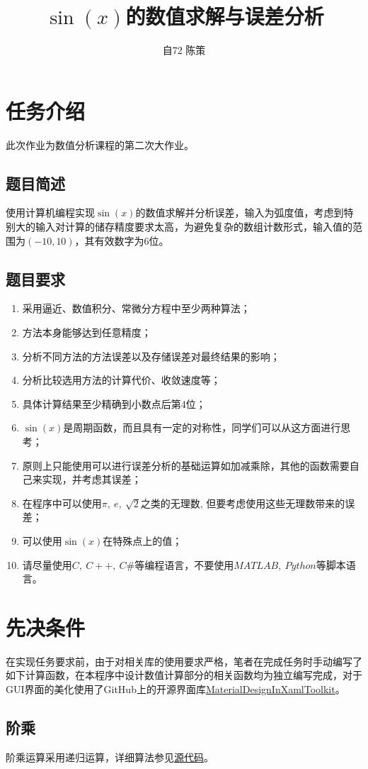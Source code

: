 \documentclass[lang=cn,11pt,a4paper]{elegantpaper}
\title{$\sin(x)$的数值求解与误差分析}
\author{自72 \quad 陈策 \quad 2017011619}
\date{\zhtoday}
\begin{document}
\maketitle
\tableofcontents
\clearpage
\section{任务介绍}
此次作业为数值分析课程的第二次大作业。
\subsection{题目简述}
使用计算机编程实现$\sin(x)$的数值求解并分析误差，输入为弧度值，考虑到特别大的输入对计算的储存精度要求太高，为避免复杂的数组计数形式，输入值的范围为$(-10,10)$，其有效数字为6位。
\subsection{题目要求}
\begin{enumerate}
  \item 采用逼近、数值积分、常微分方程中至少两种算法；
  \item 方法本身能够达到任意精度；
  \item 分析不同方法的方法误差以及存储误差对最终结果的影响；
  \item 分析比较选用方法的计算代价、收敛速度等；
  \item 具体计算结果至少精确到小数点后第4位；
  \item $\sin(x)$是周期函数，而且具有一定的对称性，同学们可以从这方面进行思考；
  \item 原则上只能使用可以进行误差分析的基础运算如加减乘除，其他的函数需要自己来实现，并考虑其误差；
  \item 在程序中可以使用$\pi,\ e, \ \sqrt{2}$之类的无理数, 但要考虑使用这些无理数带来的误差；
  \item 可以使用$\sin(x)$在特殊点上的值；
  \item 请尽量使用$C,\ C++,\ C\#$等编程语言，不要使用$MATLAB,\ Python$等脚本语言。
\end{enumerate}
\section{先决条件}
在实现任务要求前，由于对相关库的使用要求严格，笔者在完成任务时手动编写了如下计算函数，在本程序中设计数值计算部分的相关函数均为独立编写完成，对于GUI界面的美化使用了GitHub上的开源界面库\href{https://github.com/MaterialDesignInXAML/MaterialDesignInXamlToolkit}{MaterialDesignInXamlToolkit}。
\subsection{阶乘}
阶乘运算采用递归运算，详细算法参见\href{https://github.com/Antonio-Chan/SineCalculate}{源代码}。
\end{document}

